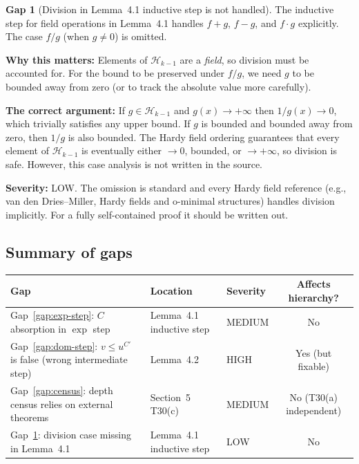 \documentclass[12pt,a4paper]{article}
\theoremstyle{definition}
\newtheorem{gap}{Gap}
\theoremstyle{remark}
\begin{document}
\begin{gap}[Division in Lemma~4.1 inductive step is not
handled]\label{gap:division}
The inductive step for field operations in Lemma~4.1 handles $f+g$, $f-g$,
and $f\cdot g$ explicitly.  The case $f/g$ (when $g\neq 0$) is omitted.

\noindent\textbf{Why this matters:} Elements of $\mathcal{H}_{k-1}$ are a
\emph{field}, so division must be accounted for.  For the bound to be preserved
under $f/g$, we need $g$ to be bounded away from zero (or to track the absolute
value more carefully).

\noindent\textbf{The correct argument:} If $g\in\mathcal{H}_{k-1}$ and
$g(x)\to+\infty$ then $1/g(x)\to 0$, which trivially satisfies any upper bound.
If $g$ is bounded and bounded away from zero, then $1/g$ is also bounded.
The Hardy field ordering guarantees that every element of $\mathcal{H}_{k-1}$
is eventually either $\to 0$, bounded, or $\to+\infty$, so division is safe.
However, this case analysis is not written in the source.

\noindent\textbf{Severity:} LOW.  The omission is standard and every Hardy
field reference (e.g., van den Dries--Miller, Hardy fields and o-minimal
structures) handles division implicitly.  For a fully self-contained proof it
should be written out.
\end{gap}

\subsection{Summary of gaps}

\begin{center}
\begin{tabular}{@{}lllc@{}}
\toprule
\textbf{Gap} & \textbf{Location} & \textbf{Severity} &
\textbf{Affects hierarchy?} \\
\midrule
Gap~\ref{gap:exp-step}: $C$ absorption in $\exp$ step
  & Lemma~4.1 inductive step & MEDIUM & No \\
Gap~\ref{gap:dom-step}: $v\leq u^{C'}$ is false (wrong
  intermediate step) & Lemma~4.2 & HIGH & Yes (but fixable) \\
Gap~\ref{gap:census}: depth census relies on external theorems
  & Section~5 T30(c) & MEDIUM & No (T30(a) independent) \\
Gap~\ref{gap:division}: division case missing in Lemma~4.1
  & Lemma~4.1 inductive step & LOW & No \\
\bottomrule
\end{tabular}
\end{center}
\end{document}
